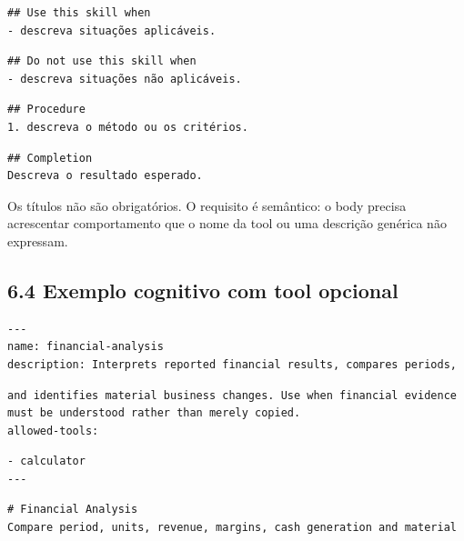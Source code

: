 \documentclass[12pt,a4paper]{article}
\begin{document}
\begin{Verbatim}[breaklines=true,breakanywhere=true,fontsize=\small]
## Use this skill when
- descreva situações aplicáveis.
\end{Verbatim}

\begin{Verbatim}[breaklines=true,breakanywhere=true,fontsize=\small]
## Do not use this skill when
- descreva situações não aplicáveis.
\end{Verbatim}

\begin{Verbatim}[breaklines=true,breakanywhere=true,fontsize=\small]
## Procedure
1. descreva o método ou os critérios.
\end{Verbatim}

\begin{Verbatim}[breaklines=true,breakanywhere=true,fontsize=\small]
## Completion
Descreva o resultado esperado.
\end{Verbatim}

Os títulos não são obrigatórios. O requisito é semântico: o body precisa acrescentar comportamento que o nome da tool ou uma descrição genérica não expressam.


\subsection*{6.4 Exemplo cognitivo com tool opcional}

\begin{Verbatim}[breaklines=true,breakanywhere=true,fontsize=\small]
---
name: financial-analysis
description: Interprets reported financial results, compares periods,
\end{Verbatim}

\begin{Verbatim}[breaklines=true,breakanywhere=true,fontsize=\small]
and identifies material business changes. Use when financial evidence
must be understood rather than merely copied.
allowed-tools:
\end{Verbatim}

\begin{Verbatim}[breaklines=true,breakanywhere=true,fontsize=\small]
- calculator
---
\end{Verbatim}

\begin{Verbatim}[breaklines=true,breakanywhere=true,fontsize=\small]
# Financial Analysis
Compare period, units, revenue, margins, cash generation and material
\end{Verbatim}
\end{document}
